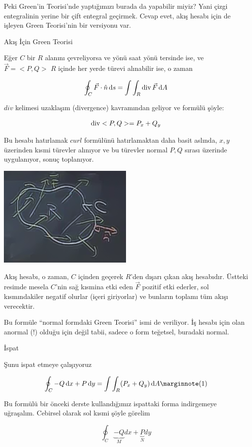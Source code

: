 \documentclass[12pt,fleqn]{article}\usepackage{../../common}
\begin{document}
Peki Green'in Teorisi'nde yaptığımızı burada da yapabilir miyiz? Yani çizgi
entegralinin yerine bir çift entegral geçirmek. Cevap evet, akış hesabı için de
işleyen Green Teorisi'nin bir versiyonu var.

Akış İçin Green Teorisi

Eğer $C$ bir $R$ alanını çevreliyorsa ve yönü saat yönü tersinde ise, ve
$\vec{F}=< P,Q >$ $R$ içinde her yerde türevi alınabilir ise, o zaman 

$$ \oint_C \vec{F} \cdot \hat{n} \,\mathrm{d} s = 
\int \int_R \operatorname{div} \vec{F} \,\mathrm{d} A
$$

$div$ kelimesi uzaklaşım (divergence) kavramından geliyor ve formülü şöyle:

$$ \operatorname{div} < P,Q > = P_x + Q_y $$

Bu hesabı hatırlamak $curl$ formülünü hatırlamaktan daha basit aslında,
$x,y$ üzerinden kısmi türevler alınıyor ve bu türevler normal $P,Q$ sırası
üzerinde uygulanıyor, sonuç toplanıyor. 
\begin{center}
\includegraphics[height=5cm]{23_8.png}
\end{center}
Akış hesabı, o zaman, $C$ içinden geçerek $R$'den dışarı çıkan akış
hesabıdır. Üstteki resimde mesela $C$'nin sağ kısmina etki eden $\vec{F}$
pozitif etki ederler, sol kısmındakiler negatif olurlar (içeri giriyorlar)
ve bunların toplamı tüm akışı verecektir. 

Bu formüle ``normal formdaki Green Teorisi'' ismi de veriliyor. İş hesabı
için olan anormal (!) olduğu için değil tabii, sadece o form teğetsel,
buradaki normal. 

İspat

Şunu ispat etmeye çalışıyoruz

$$
\oint_C -Q \ud x + P \ud y = \int \int_R (P_x + Q_y) \ud A 
\mlabel{1}
$$

Bu formülü bir önceki derste kullandığımız ispattaki forma indirgemeye
uğraşalım. Cebirsel olarak sol kısmi şöyle görelim

$$ \oint_C 
\underbrace{-Q}_{M}dx + 
\underbrace{P}_{N}dy 
$$
\end{document}
